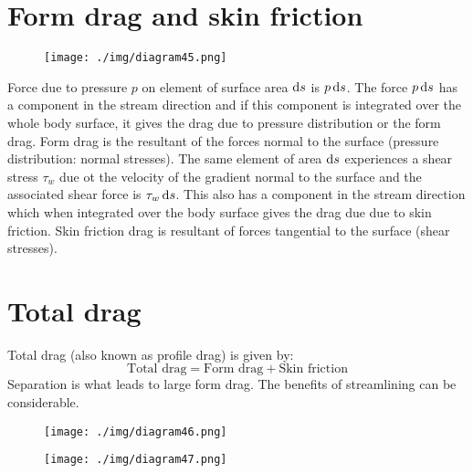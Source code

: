 \section{Form drag and skin friction}
\begin{figure}[H]
  \centering
  \texttt{[image: ./img/diagram45.png]}
\end{figure}
Force due to pressure $p$ on element of surface area $\dif s$ is $p \dif s$. The force $p \dif s$ has a component in the stream direction and if this component is integrated over the whole body surface, it gives the drag due to pressure distribution or the form drag. Form drag is the resultant of the forces normal to the surface (pressure distribution: normal stresses). The same element of area $\dif s$ experiences a shear stress $\tau_w$ due ot the velocity of the gradient normal to the surface and the associated shear force is $\tau_w \dif s$. This also has a component in the stream direction which when integrated over the body surface gives the drag due due to skin friction. Skin friction drag is resultant of forces tangential to the surface (shear stresses).
\section{Total drag}
Total drag (also known as profile drag) is given by:
\begin{equation}
  \textrm{Total drag} = \textrm{Form drag} + \textrm{Skin friction}
\end{equation}
Separation is what leads to large form drag. The benefits of streamlining can be considerable.
\begin{figure}[H]
  \centering
  \texttt{[image: ./img/diagram46.png]}
\end{figure}
\begin{figure}[H]
  \centering
  \texttt{[image: ./img/diagram47.png]}
\end{figure}